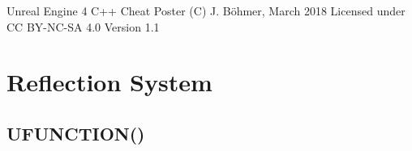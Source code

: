 \documentclass[10pt]{article}
\begin{document}
\begin{multicols*}{5}
	
	\begin{center}
		\Huge{Unreal Engine 4 C++ Cheat Poster}
		\linebreak
		\Large{(C) J. Böhmer, March 2018  \linebreak Licensed under CC BY-NC-SA 4.0}
		\linebreak
		\Large{Version 1.1}
	\end{center}
	
	\section{Reflection System}
	
	\subsection{UFUNCTION()}
	
	\begin{tabularx}{\columnwidth}{|p{4.1cm}|X|}
		

\end{tabularx}
\end{multicols*}
\end{document}
